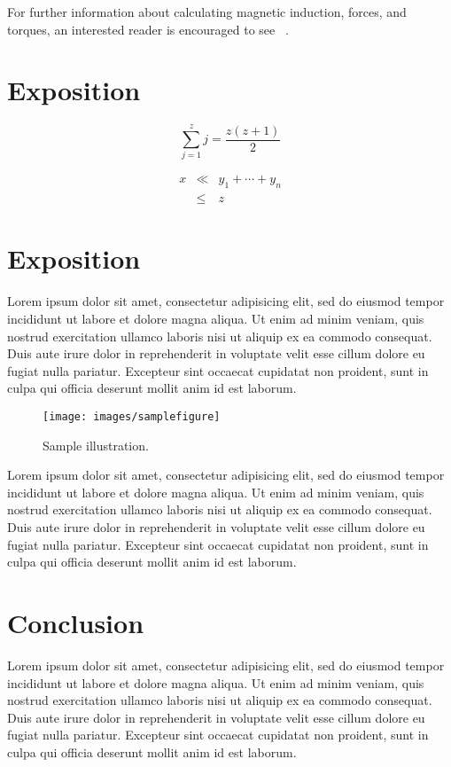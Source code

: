 \documentclass[tog]{acmsiggraph}
\begin{document}
For further information about calculating magnetic induction, forces, and torques, an interested reader is encouraged to see ~\cite{Thomaszewski:2008:MIM}.

\section{Exposition}

\begin{equation}
 \sum_{j=1}^{z} j = \frac{z(z+1)}{2}
\end{equation}

\begin{eqnarray}
x & \ll & y_{1} + \cdots + y_{n} \\
  & \leq & z
\end{eqnarray}

\section{Exposition}

Lorem ipsum dolor sit amet, consectetur adipisicing elit, sed do
eiusmod tempor incididunt ut labore et dolore magna aliqua. Ut enim ad
minim veniam, quis nostrud exercitation ullamco laboris nisi ut
aliquip ex ea commodo consequat. Duis aute irure dolor in
reprehenderit in voluptate velit esse cillum dolore eu fugiat nulla
pariatur. Excepteur sint occaecat cupidatat non proident, sunt in
culpa qui officia deserunt mollit anim id est laborum.
\begin{figure}[ht]
  \centering
  \texttt{[image: images/samplefigure]}
  \caption{Sample illustration.}
\end{figure}
Lorem ipsum dolor sit amet, consectetur adipisicing elit, sed do
eiusmod tempor incididunt ut labore et dolore magna aliqua. Ut enim ad
minim veniam, quis nostrud exercitation ullamco laboris nisi ut
aliquip ex ea commodo consequat. Duis aute irure dolor in
reprehenderit in voluptate velit esse cillum dolore eu fugiat nulla
pariatur. Excepteur sint occaecat cupidatat non proident, sunt in
culpa qui officia deserunt mollit anim id est laborum.

\section{Conclusion}

Lorem ipsum dolor sit amet, consectetur adipisicing elit, sed do
eiusmod tempor incididunt ut labore et dolore magna aliqua. Ut enim ad
minim veniam, quis nostrud exercitation ullamco laboris nisi ut
aliquip ex ea commodo consequat. Duis aute irure dolor in
reprehenderit in voluptate velit esse cillum dolore eu fugiat nulla
pariatur. Excepteur sint occaecat cupidatat non proident, sunt in
culpa qui officia deserunt mollit anim id est laborum.
\end{document}
